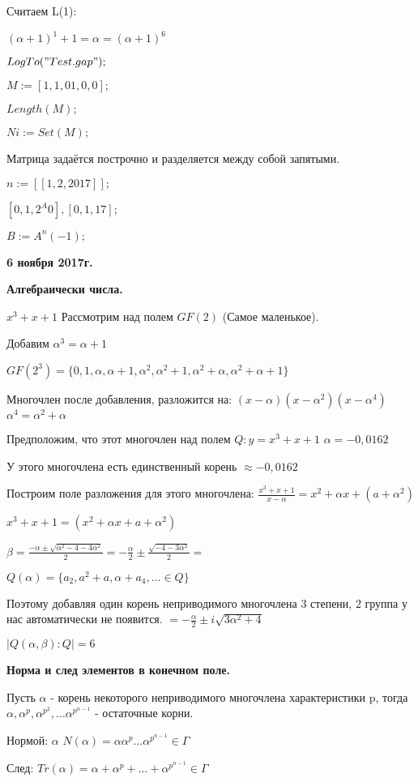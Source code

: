 \documentclass{article}
\begin{document}
Считаем L(1):

$(\alpha+1)^1+1=\alpha=(\alpha+1)^6$

$LogTo("Test.gap");$

$M:=[1, 1, 01, 0, 0];$

$Length(M);$

$Ni:=Set(M);$

Матрица задаётся построчно и разделяется между собой запятыми.

$n:=[[1, 2, 2017]];$

$[0, 1, 2^A0], [0, 1, 17];$

$B:=A^n(-1);$

\textbf {6 ноября 2017г.}

{\bf Алгебраически числа.}

$x^3+x+1$ Рассмотрим над полем $GF(2)$ (Самое маленькое).

Добавим $\alpha^3=\alpha+1$

$GF(2^3)=\{0,1,\alpha, \alpha +1, \alpha^2, \alpha^2+1, \alpha^2+\alpha, \alpha^2+\alpha+1\}$

Многочлен после добавления, разложится на: $(x-\alpha)(x-\alpha^2)(x-\alpha^4) $ $ \alpha^4=\alpha^2+\alpha$

Предположим, что этот многочлен над полем $Q: y=x^3+x+1$ $\alpha=-0,0162$

У этого многочлена есть единственный корень $\approx -0,0162$

Построим поле разложения для этого многочлена: $\frac{x^3+x+1}{x-\alpha}=x^2+\alpha x+(a+\alpha^2)$

$x^3+x+1=(x^2+\alpha x+a+\alpha^2)$

$\beta = \frac{-\alpha\pm\sqrt{\alpha^2-4-4\alpha^2}}{2}=-\frac{\alpha}{2}\pm \frac{\sqrt{-4-3\alpha^2}}{2} = $

$Q(\alpha)=\{a_2, a^2+a, \alpha+a_4, \ldots \in Q\}$

Поэтому добавляя один корень неприводимого многочлена 3 степени, 2 группа у нас автоматически не появится. $= -\frac{\alpha}{2}\pm i\sqrt{3\alpha^2+4}$

$|Q(\alpha, \beta): Q|=6$

{\bf Норма и след элементов в конечном поле.}

Пусть $\alpha$ - корень некоторого неприводимого многочлена характеристики p, тогда $\alpha, \alpha^p, \alpha^{p^2}, \ldots \alpha^{p^{n-1}}$ - остаточные корни.

Нормой: $\alpha$ $N(\alpha)=\alpha\alpha^p\ldots\alpha^{p^{n-1}}\in \Gamma$

След: $Tr(\alpha)=\alpha+\alpha^p+\ldots+\alpha^{p^{n-1}}\in \Gamma$
\end{document}
